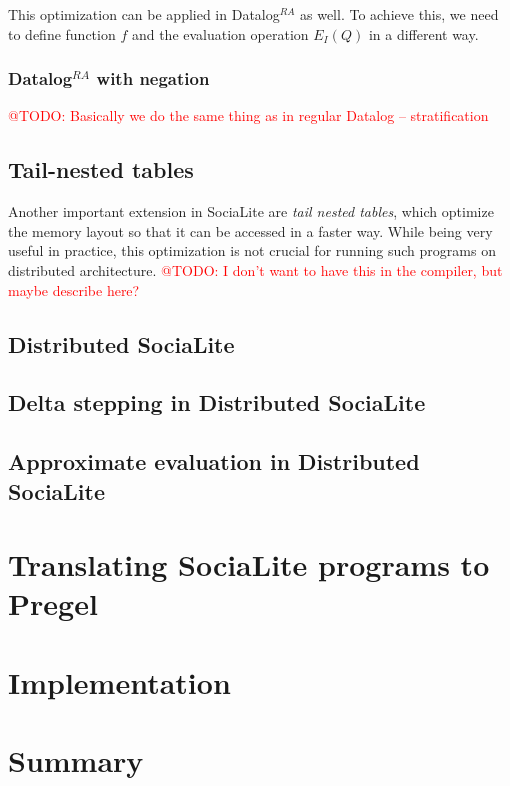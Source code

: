 \documentclass{pracamgr}
\makeatletter
\theoremstyle{plain}
\theoremstyle{definition}
\theoremstyle{remark}
\newcommand{\todo}[1]{\textcolor{red}{@TODO: #1}}
\newcommand{\datalogra}{Datalog$^{RA}$ }
\makeatother
\begin{document}
This optimization can be applied in \datalogra as well. To achieve this, we need to define function $f$ and the evaluation operation $E_I(Q)$ in a different way.




\subsection{\datalogra with negation}
\todo{Basically we do the same thing as in regular Datalog -- stratification}


\section{Tail-nested tables}\label{s:tnt}
Another important extension in SociaLite are \emph{tail nested tables}, which optimize the memory layout so that it can be accessed in a faster way. While being very useful in practice, this optimization is not crucial for running such programs on distributed architecture. \todo{I don't want to have this in the compiler, but maybe describe here?}

\section{Distributed SociaLite}\label{s:distributed}

\section{Delta stepping in Distributed SociaLite}\label{s:deltastep}

\section{Approximate evaluation in Distributed SociaLite}\label{s:approxdist}

\chapter{Translating SociaLite programs to Pregel}\label{r:s2p}

\chapter{Implementation}\label{r:implementation}

\chapter{Summary}\label{r:summary}
\end{document}
